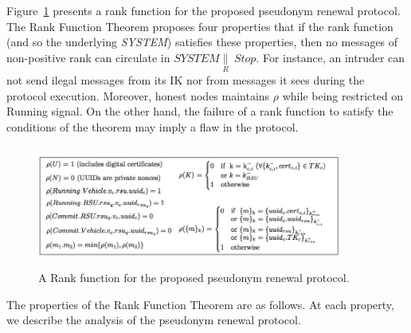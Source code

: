 \documentclass[preprint,12pt]{elsarticle}
\begin{document}
Figure~\ref{fig:rankfunction} presents a rank function for the proposed pseudonym renewal protocol. The Rank Function Theorem proposes four properties that if the rank function (and so the underlying \textit{SYSTEM}) satisfies these properties, then no messages of non-positive rank can circulate in $SYSTEM \underset{R}{\|}~\textit{Stop}$. For instance, an intruder can not send ilegal messages from its IK nor from messages it sees during the protocol execution. Moreover, honest nodes maintains $\rho$ while being restricted on Running signal. On the other hand, the failure of a rank function to satisfy the conditions of the theorem may imply a flaw in the protocol.

\begin{figure}[h]
\centering
\includegraphics[width=10cm, height=4cm]{figures/rankfunctionvalues.jpg}
\caption{
A Rank function for the proposed pseudonym renewal protocol.}
\label{fig:rankfunction}
\end{figure}

The properties of the Rank Function Theorem are as follows. At each property, we describe the analysis of the pseudonym renewal protocol.
\end{document}
